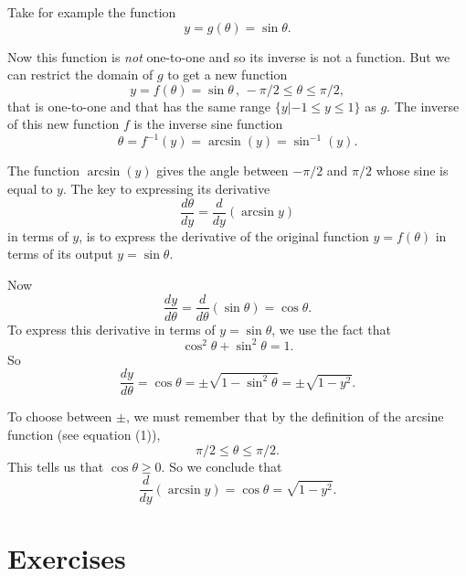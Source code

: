 \documentclass{ximera}
\begin{document}
\begin{example} \label{Ecbfghnbng}
Take for example the function
\[
     y = g(\theta) = \sin\theta.
\]

Now this function is \emph{not} one-to-one and so its inverse is not a function. But we can restrict the domain of $g$ to get a new function
\begin{equation}  
     y =f(\theta) = \sin\theta \, , \, -\pi/2 \leq \theta \leq \pi/2 , \label{Eq:ArcSine}
\end{equation}
that is one-to-one and that has the same range $\{y | -1 \leq y \leq 1\}$ as $g$. The inverse of this new function $f$ is the inverse sine function
\[
    \theta = f^{-1}(y) = \arcsin(y) = \sin^{-1}(y) .
\]

The function $\arcsin (y)$ gives the angle between $-\pi/2$ and $\pi/2$ whose sine is equal to $y$. The key to expressing its derivative
\[
  \frac{d\theta}{dy} = \frac{d}{dy}\left(  \arcsin y \right)
\]
in terms of $y$, is to express the derivative of the original function $y=f(\theta)$ in terms of its output $y=\sin\theta$.

Now
\[
     \frac{dy}{d\theta} = \frac{d}{d\theta} \left( \sin\theta \right) = \cos\theta .
\]
To express this derivative in terms of $y=\sin\theta$, we use the fact that 
\[
 \cos^2\theta + \sin^2\theta = 1 .
\]
So 
\[
      \frac{dy}{d\theta} = \cos\theta = \pm \sqrt{1-\sin^2\theta} = \pm \sqrt{1-y^2}.
\]

To choose between $\pm$, we must remember that by the definition of the arcsine function (see equation (1)), 
\[
   \pi/2 \leq \theta \leq \pi/2 .
\]
This tells us that $\cos\theta \geq 0$. So we conclude that
\[
\frac{d}{dy}\left(  \arcsin y \right)  =\cos\theta = \sqrt{1-y^2}.
\]
\end{example}

\section{Exercises}
\end{document}
